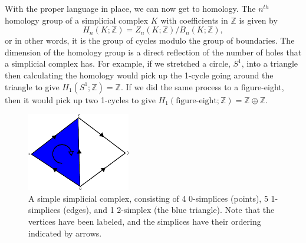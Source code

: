 \documentclass[a4paper,12pt]{report}
\begin{document}
With the proper language in place, we can now get to homology. The $n^{th}$ homology group of a simplicial complex $K$ with coefficients in $\mathbb{Z}$ is given by
\[
 H_n(K;\mathbb{Z}) = Z_n(K;\mathbb{Z})/B_n(K;\mathbb{Z}),
\]
or in other words, it is the group of cycles modulo the group of boundaries. The dimension of the homology group is a direct reflection of the number of holes that a simplicial complex has. For example, if we stretched a circle, $S^1$, into a triangle then calculating the homology would pick up the 1-cycle going around the triangle to give $H_1(S^1;\mathbb{Z}) = \mathbb{Z}$. If we did the same process to a figure-eight, then it would pick up two 1-cycles to give $H_1(\textrm{figure-eight};\mathbb{Z}) = \mathbb{Z}\oplus\mathbb{Z}$.

  \singlespacing
\begin{figure}[!htbp]
 \centering
 \includegraphics[width=0.4\textwidth]{complex_example.pdf}
 \caption{\label{fig:example} A simple simplicial complex, consisting of 4 0-simplices (points), 5 1-simplices (edges), and 1 2-simplex (the blue triangle). Note that the vertices have been labeled, and the simplices have their ordering indicated by arrows. }
\end{figure}
\doublespacing 
\end{document}

